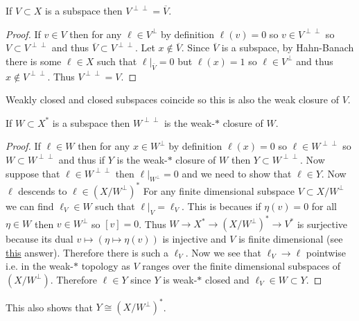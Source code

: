 \documentclass[12pt]{article}
\begin{document}
\begin{lemma}
If $V \subset X$ is a subspace then $V^{\perp \perp} = \overline{V}$.
\end{lemma}

\begin{proof}
If $v \in V$ then for any $\ell \in V^\perp$ by definition $\ell(v) = 0$ so $v \in V^{\perp \perp}$ so $V \subset V^{\perp \perp}$ and thus $\overline{V} \subset V^{\perp \perp}$. Let $x \notin \overline{V}$. Since $\overline{V}$ is a subspace, by Hahn-Banach there is some $\ell \in X$ such that $\ell|_{\overline{V}} = 0$ but $\ell(x) = 1$ so $\ell \in V^\perp$ and thus $x \notin V^{\perp\perp}$. Thus $V^{\perp\perp} = V$.
\end{proof}

\begin{rmk}
Weakly closed and closed subspaces coincide so this is also the weak closure of $V$.
\end{rmk}

\begin{lemma}
If $W \subset X^*$ is a subspace then $W^{\perp \perp}$ is the weak-$*$ closure of $W$.
\end{lemma}

\begin{proof}
If $\ell \in W$ then for any $x \in W^\perp$ by definition $\ell(x) = 0$ so $\ell \in W^{\perp\perp}$ so $W \subset W^{\perp\perp}$ and thus if $Y$ is the weak-$*$ closure of $W$ then $Y \subset W^{\perp \perp}$. Now suppose that $\ell \in W^{\perp\perp}$ then $\ell|_{W^\perp} = 0$ and we need to show that $\ell \in Y$. Now $\ell$ descends to $\ell \in (X / W^\perp)^*$ For any finite dimensional subspace $V \subset X/W^\perp$ we can find $\ell_V \in W$ such that $\ell|_V = \ell_V$. This is becaues if $\eta(v) = 0$ for all $\eta \in W$ then $v \in W^\perp$ so $[v] = 0$. Thus $W \to X^* \to (X/W^\perp)^* \to V^*$ is surjective because its dual $v \mapsto (\eta \mapsto \eta(v))$ is injective and $V$ is finite dimensional (see \href{https://math.stackexchange.com/questions/3743687/weak-closed-subspaces-and-preduals-a-la-von-neumann-algebras}{this} answer). Therefore there is such a $\ell_V$. Now we see that $\ell_V \to \ell$ pointwise i.e. in the weak-$*$ topology as $V$ ranges over the finite dimensional subspaces of $(X / W^\perp)$. Therefore $\ell \in Y$ since $Y$ is weak-$*$ closed and $\ell_V \in W \subset Y$.
\end{proof}

\begin{rmk}
This also shows that $Y \cong (X / W^\perp)^*$.
\end{rmk}
\end{document}
